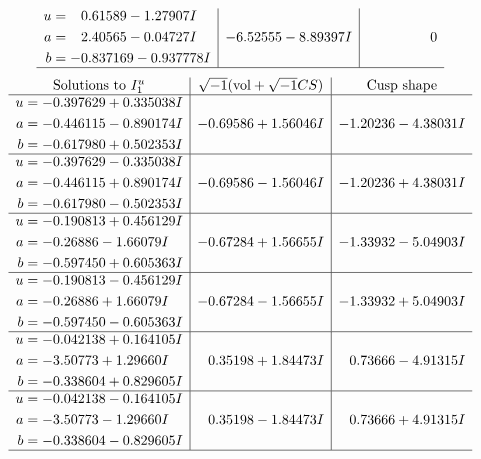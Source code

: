\documentclass[1p]{elsarticle_modified}
\theoremstyle{definition}
\newcommand{\I}{\sqrt{-1}}
\begin{document}
$$\begin{array}{c|c|c}
\begin{aligned}
u &= \phantom{-}0.61589 - 1.27907 I \\
a &= \phantom{-}2.40565 - 0.04727 I \\
b &= -0.837169 - 0.937778 I\end{aligned}
 & -6.52555 - 8.89397 I & \phantom{-0.000000 } 0\\
 \hline 
 \end{array}$$\newpage$$\begin{array}{c|c|c}  
\text{Solutions to }I^u_{1}& \I (\text{vol} + \sqrt{-1}CS) & \text{Cusp shape}\\
 \hline 
\begin{aligned}
u &= -0.397629 + 0.335038 I \\
a &= -0.446115 - 0.890174 I \\
b &= -0.617980 + 0.502353 I\end{aligned}
 & -0.69586 + 1.56046 I & -1.20236 - 4.38031 I \\ \hline\begin{aligned}
u &= -0.397629 - 0.335038 I \\
a &= -0.446115 + 0.890174 I \\
b &= -0.617980 - 0.502353 I\end{aligned}
 & -0.69586 - 1.56046 I & -1.20236 + 4.38031 I \\ \hline\begin{aligned}
u &= -0.190813 + 0.456129 I \\
a &= -0.26886 - 1.66079 I \\
b &= -0.597450 + 0.605363 I\end{aligned}
 & -0.67284 + 1.56655 I & -1.33932 - 5.04903 I \\ \hline\begin{aligned}
u &= -0.190813 - 0.456129 I \\
a &= -0.26886 + 1.66079 I \\
b &= -0.597450 - 0.605363 I\end{aligned}
 & -0.67284 - 1.56655 I & -1.33932 + 5.04903 I \\ \hline\begin{aligned}
u &= -0.042138 + 0.164105 I \\
a &= -3.50773 + 1.29660 I \\
b &= -0.338604 + 0.829605 I\end{aligned}
 & \phantom{-}0.35198 + 1.84473 I & \phantom{-}0.73666 - 4.91315 I \\ \hline\begin{aligned}
u &= -0.042138 - 0.164105 I \\
a &= -3.50773 - 1.29660 I \\
b &= -0.338604 - 0.829605 I\end{aligned}
 & \phantom{-}0.35198 - 1.84473 I & \phantom{-}0.73666 + 4.91315 I\\
 \hline 
 \end{array}$$\newpage\newpage\renewcommand{\arraystretch}{1}
\end{document}
